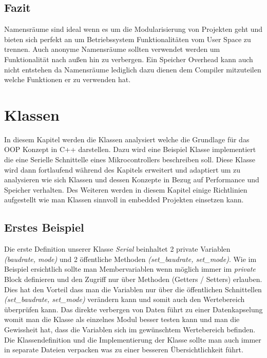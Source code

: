 \documentclass[MES,Master,ngerman]{twbook}%
\begin{document}
\subsection{Fazit}
Namensräume sind ideal wenn es um die Modularisierung von Projekten geht und bieten sich perfekt an um Betriebssystem Funktionalitäten vom User Space zu trennen. Auch anonyme Namensräume sollten verwendet werden um Funktionalität nach außen hin zu verbergen. Ein Speicher Overhead kann auch nicht entstehen da Namensräume lediglich dazu dienen dem Compiler mitzuteilen welche Funktionen er zu verwenden hat.
\newpage

\section{Klassen}
In diesem Kapitel werden die Klassen analysiert welche die Grundlage für das OOP Konzept in C++ darstellen. Dazu wird eine Beispiel Klasse implementiert die eine Serielle Schnittelle eines Mikrocontrollers beschreiben soll. Diese Klasse wird dann fortlaufend während des Kapitels erweitert und adaptiert um zu analysieren wie sich Klassen und dessen Konzepte in Bezug auf Performance und Speicher verhalten. Des Weiteren werden in diesem Kapitel einige Richtlinien aufgestellt wie man Klassen sinnvoll in embedded Projekten einsetzen kann. 
\subsection{Erstes Beispiel}
Die erste Definition unserer Klasse \textit{Serial} beinhaltet 2 private Variablen \textit{(baudrate, mode)} und 2 öffentliche Methoden \textit{(set\_baudrate, set\_mode)}. Wie im Beispiel ersichtlich sollte man Membervariablen wenn möglich immer im \textit{private} Block definieren und den Zugriff nur über Methoden (Getters / Setters) erlauben. Dies hat den Vorteil dass man die Variablen nur über die öffentlichen Schnittellen \textit{(set\_baudrate, set\_mode)} verändern kann und somit auch den Wertebereich überprüfen kann. Das direkte verbergen von Daten führt zu einer Datenkapselung womit man die Klasse als einzelnes Modul besser testen kann und man die Gewissheit hat, dass die Variablen sich im gewünschtem Wertebereich befinden. Die Klassendefinition und die Implementierung der Klasse sollte man auch immer in separate Dateien verpacken was zu einer besseren Übersichtlichkeit führt. \newline 
\begin{figure}[!htb]
	\begin{subfigure}[b]{0.5\textwidth}
		
		\label{fig:19}
	\end{subfigure}
	\begin{subfigure}[b]{0.5\textwidth}
		
		\label{fig:20}
	\end{subfigure}
\end{figure}
\end{document}
